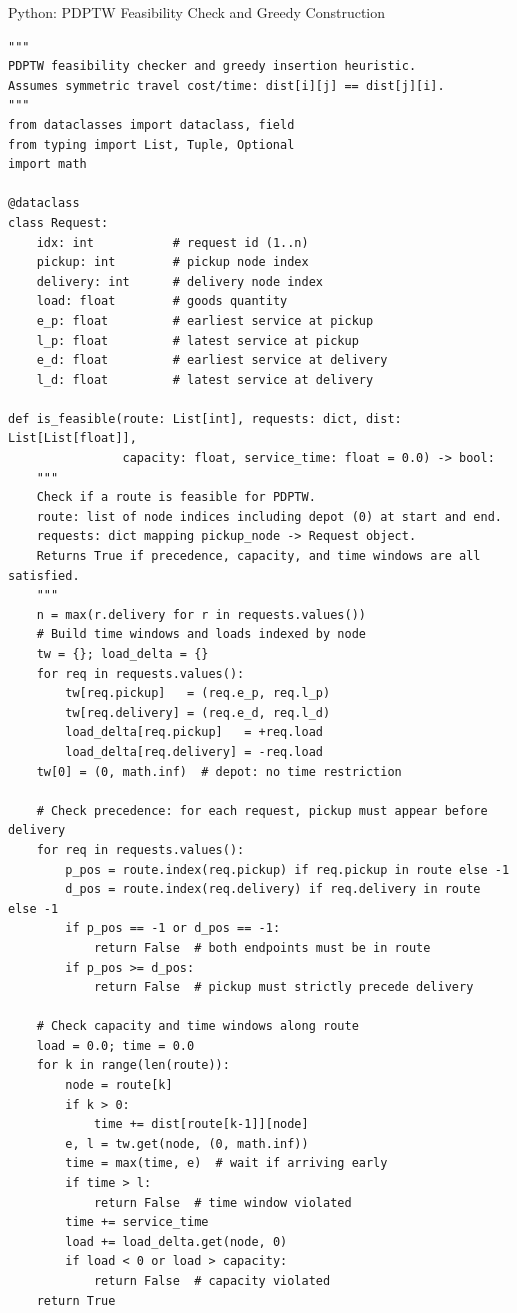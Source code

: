 \documentclass[aspectratio=169,10pt]{beamer}
\begin{document}
\begin{frame}[fragile]{Python: PDPTW Feasibility Check and Greedy Construction}
\begin{lstlisting}
"""
PDPTW feasibility checker and greedy insertion heuristic.
Assumes symmetric travel cost/time: dist[i][j] == dist[j][i].
"""
from dataclasses import dataclass, field
from typing import List, Tuple, Optional
import math

@dataclass
class Request:
    idx: int           # request id (1..n)
    pickup: int        # pickup node index
    delivery: int      # delivery node index
    load: float        # goods quantity
    e_p: float         # earliest service at pickup
    l_p: float         # latest service at pickup
    e_d: float         # earliest service at delivery
    l_d: float         # latest service at delivery

def is_feasible(route: List[int], requests: dict, dist: List[List[float]],
                capacity: float, service_time: float = 0.0) -> bool:
    """
    Check if a route is feasible for PDPTW.
    route: list of node indices including depot (0) at start and end.
    requests: dict mapping pickup_node -> Request object.
    Returns True if precedence, capacity, and time windows are all satisfied.
    """
    n = max(r.delivery for r in requests.values())
    # Build time windows and loads indexed by node
    tw = {}; load_delta = {}
    for req in requests.values():
        tw[req.pickup]   = (req.e_p, req.l_p)
        tw[req.delivery] = (req.e_d, req.l_d)
        load_delta[req.pickup]   = +req.load
        load_delta[req.delivery] = -req.load
    tw[0] = (0, math.inf)  # depot: no time restriction

    # Check precedence: for each request, pickup must appear before delivery
    for req in requests.values():
        p_pos = route.index(req.pickup) if req.pickup in route else -1
        d_pos = route.index(req.delivery) if req.delivery in route else -1
        if p_pos == -1 or d_pos == -1:
            return False  # both endpoints must be in route
        if p_pos >= d_pos:
            return False  # pickup must strictly precede delivery

    # Check capacity and time windows along route
    load = 0.0; time = 0.0
    for k in range(len(route)):
        node = route[k]
        if k > 0:
            time += dist[route[k-1]][node]
        e, l = tw.get(node, (0, math.inf))
        time = max(time, e)  # wait if arriving early
        if time > l:
            return False  # time window violated
        time += service_time
        load += load_delta.get(node, 0)
        if load < 0 or load > capacity:
            return False  # capacity violated
    return True


\end{lstlisting}
\end{frame}
\end{document}
